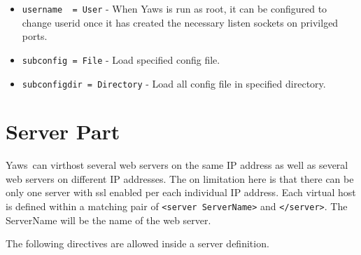 \documentclass[11pt,oneside,english]{book}
\newcommand{\Yaws}            %
        {{\sc Yaws}}
\begin{document}
\begin{itemize}
\item        \verb+username  = User+ -
             When Yaws is run as root, it can be configured to
             change userid once it has created the necessary
             listen sockets on privilged ports.

\item        \verb+subconfig = File+ -
             Load specified config file.

\item        \verb+subconfigdir = Directory+ -
             Load all config file in specified directory.

\end{itemize}



\section{Server Part}

\Yaws\   can  virthost  several  web servers  on  the  same IP
       address as well as  several  web servers  on  different  IP
       addresses.  The  on  limitation  here is that there can be
       only one server with ssl enabled per  each  individual  IP
       address.   Each virtual host is defined within a matching
       pair of \verb+<server ServerName>+ and \verb+</server>+.
       The  ServerName
       will be the name of the web server.

       The following directives are allowed inside a server definition.
\end{document}
